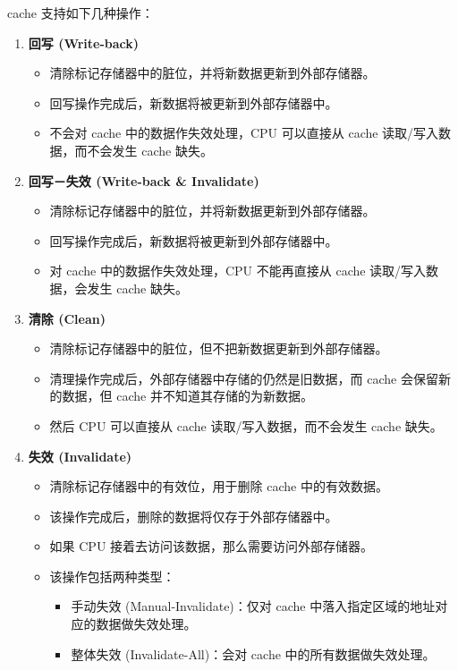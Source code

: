 \documentclass[main\_\_CN.tex]{subfiles}
\begin{document}
\chipname{} cache 支持如下几种操作：
\begin{enumerate}
\item \textbf{回写 (Write-back)}
\begin{itemize}
    \item 清除标记存储器中的脏位，并将新数据更新到外部存储器。
    \item 回写操作完成后，新数据将被更新到外部存储器中。
    \item 不会对 cache 中的数据作失效处理，CPU 可以直接从 cache 读取/写入数据，而不会发生 cache 缺失。
\end{itemize}

\item \textbf{回写－失效 (Write-back \& Invalidate)}
\begin{itemize}
    \item 清除标记存储器中的脏位，并将新数据更新到外部存储器。
    \item 回写操作完成后，新数据将被更新到外部存储器中。
    \item 对 cache 中的数据作失效处理，CPU 不能再直接从 cache 读取/写入数据，会发生 cache 缺失。
\end{itemize}

\item \textbf{清除 (Clean)}
\begin{itemize}
    \item 清除标记存储器中的脏位，但不把新数据更新到外部存储器。
    \item 清理操作完成后，外部存储器中存储的仍然是旧数据，而 cache 会保留新的数据，但 cache 并不知道其存储的为新数据。
    \item 然后 CPU 可以直接从 cache 读取/写入数据，而不会发生 cache 缺失。
\end{itemize}

\item \textbf{失效 (Invalidate)}
\begin{itemize}
    \item 清除标记存储器中的有效位，用于删除 cache 中的有效数据。
    \item 该操作完成后，删除的数据将仅存于外部存储器中。
    \item 如果 CPU 接着去访问该数据，那么需要访问外部存储器。
    \item 该操作包括两种类型：
    \begin{itemize}
    \item 手动失效 (Manual-Invalidate)：仅对 cache 中落入指定区域的地址对应的数据做失效处理。
    \item 整体失效 (Invalidate-All)：会对 cache 中的所有数据做失效处理。
    \end{itemize}
\end{itemize}


\end{enumerate}
\end{document}
